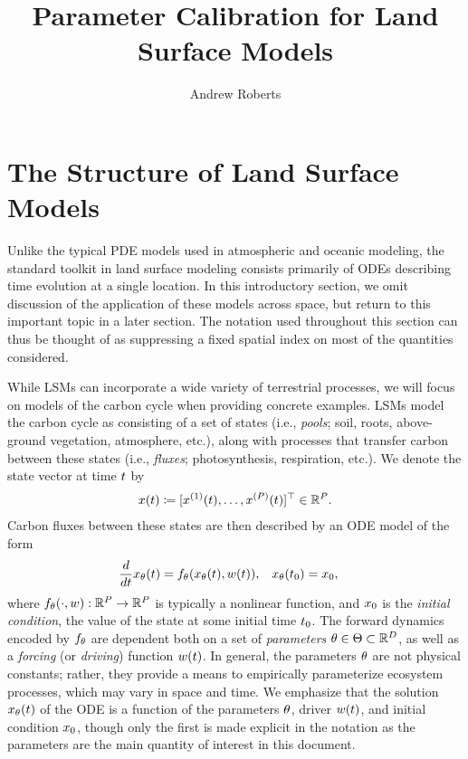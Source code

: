 \documentclass[12pt]{article}
\title{Parameter Calibration for Land Surface Models}
\author{Andrew Roberts}
\begin{document}
\maketitle

\section{The Structure of Land Surface Models}
Unlike the typical PDE models used in atmospheric and oceanic modeling, the standard toolkit in land surface modeling 
consists primarily of ODEs describing time evolution at a single location. In this introductory section, we omit discussion 
of the application of these models across space, but return to this important topic in a later section. The notation 
used throughout this section can thus be thought of as suppressing a fixed spatial index on most of the quantities considered. 

While LSMs can incorporate a wide 
variety of terrestrial processes, we will focus on models of the carbon cycle when providing concrete examples. 
LSMs model the carbon cycle as consisting of a set of states (i.e., \textit{pools}; soil, roots, above-ground vegetation, atmosphere, etc.),
along with processes that transfer carbon between these states (i.e., \textit{fluxes}; photosynthesis, respiration, etc.). 
We denote the state vector at time $\Time$ by 
\begin{align}
\state(\Time) \Def [\indexState[1]{\state}(\Time), \dots, \indexState[\dimState]{\state}(\Time)]^\top \in \R^{\dimState}.
\end{align}
Carbon fluxes between these states are then described by an ODE model of the form 
\begin{align}
&\frac{d}{d\Time} \state_{\Par}(\Time) = \funcODE_{\Par}(\state_{\Par}(\Time), \forcing(\Time)), &&\state_{\Par}(\timeInit) = \stateInit, 
\end{align}
where $\funcODE_{\Par}(\cdot, \forcing): \R^{\dimState} \to \R^{\dimState}$ is typically a nonlinear function, and $\stateInit$ is the \textit{initial condition}, 
the value of the state at some initial time $\timeInit$. The forward dynamics encoded by $\funcODE_{\Par}$ are dependent both on a set of 
\textit{parameters} $\Par \in \parSpace \subset \R^{\dimPar}$, as well as a \textit{forcing} (or \textit{driving}) function $\forcing(\Time)$.
In general, the parameters $\Par$ are not physical constants; rather, they provide a means to empirically parameterize ecosystem 
processes, which may vary in space and time.   
We emphasize that the solution $\state_{\Par}(\Time)$ of the ODE is a function of the parameters $\Par$, driver $\forcing(\Time)$, and 
initial condition $\stateInit$, though only the first is made explicit in the notation as the parameters are the main quantity of interest in this document.
\end{document}
